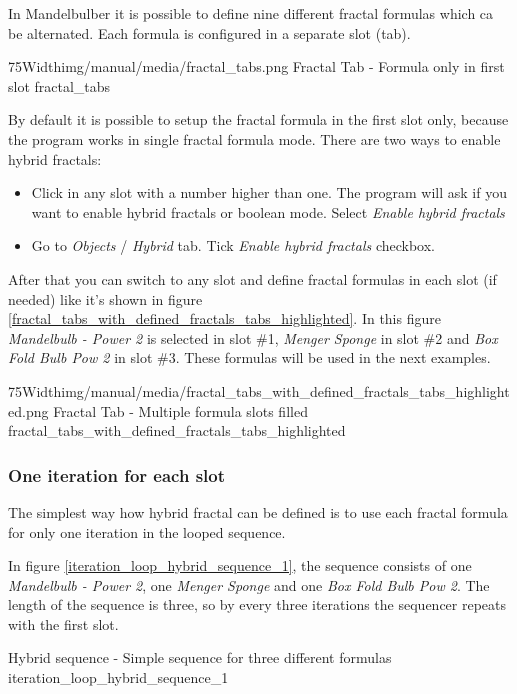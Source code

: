 In Mandelbulber it is possible to define nine different fractal formulas which
ca be alternated. Each formula is configured in a separate slot (tab).

\simpleImageWithCaption75Width{img/manual/media/fractal_tabs.png}
{Fractal Tab - Formula only in first slot}
{fractal_tabs}

By default it is possible to setup the fractal formula in the first slot only,
because the program works in single fractal formula mode. There are two ways to
enable hybrid fractals:
\begin{itemize}
	\item Click in any slot with a number higher than one. The program will ask if you want to
	      enable hybrid fractals or boolean mode. Select \emph{Enable hybrid fractals}
	\item Go to \emph{Objects} / \emph{Hybrid} tab. Tick \emph{Enable hybrid fractals} checkbox.
\end{itemize}

After that you can switch to any slot and define fractal formulas in each slot
(if needed) like it's shown in figure \ref{fractal_tabs_with_defined_fractals_tabs_highlighted}.
In this figure \emph{Mandelbulb - Power 2} is selected in slot \#1, \emph{Menger Sponge}
in slot \#2 and \emph{Box Fold Bulb Pow 2} in slot \#3. These formulas will be
used in the next examples.

\simpleImageWithCaption75Width{img/manual/media/fractal_tabs_with_defined_fractals_tabs_highlighted.png}
{Fractal Tab - Multiple formula slots filled}
{fractal_tabs_with_defined_fractals_tabs_highlighted}

\subsubsection{One iteration for each slot}

The simplest way how hybrid fractal can be defined is to use each fractal
formula for only one iteration in the looped sequence.

In figure \ref{iteration_loop_hybrid_sequence_1}, the sequence consists of one \emph{Mandelbulb - Power 2}, one \emph{Menger Sponge} and
one \emph{Box Fold Bulb Pow 2}. The length of the sequence is three, so by every three
iterations the sequencer repeats with the first slot.

{Hybrid sequence - Simple sequence for three different formulas}
{iteration_loop_hybrid_sequence_1}

